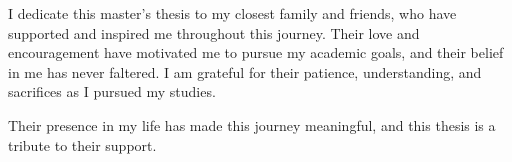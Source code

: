 
\begin{dedication}
I dedicate this master's thesis to my closest family and friends, who have supported and inspired me throughout this journey. Their love and encouragement have motivated me to pursue my academic goals, and their belief in me has never faltered. I am grateful for their patience, understanding, and sacrifices as I pursued my studies. 

Their presence in my life has made this journey meaningful, and this thesis is a tribute to their support. 

\newpage

\end{dedication}
